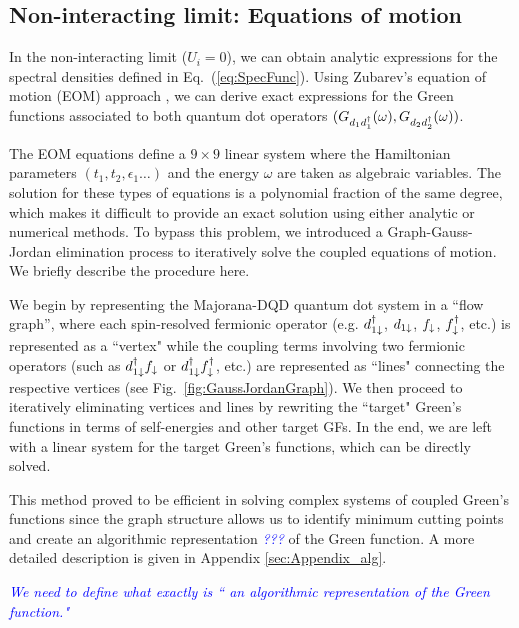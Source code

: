 \documentclass[showpacs,aps,prb,reprint,superscriptaddress]{revtex4-1}
\newcommand{\LUIS}[1]{\textcolor{blue}{\fbox{Luis} {\sl#1}}}
\begin{document}
\subsection{Non-interacting limit: Equations of motion }
\label{sec:non-interactingMethods}

In the non-interacting limit ($U_i\!=\!0$), we can obtain analytic expressions for the spectral densities defined in Eq.\ (\ref{eq:SpecFunc}). Using Zubarev's equation of motion (EOM) approach \cite{zubarev_double-time_1960}, we can derive  exact expressions for the Green functions associated to both quantum dot operators $(G_{d_1d^\dagger_1}(\omega),G_{d_2d^\dagger_2}(\omega))$. 

 The EOM  equations define a $9 \times 9$ linear system where the Hamiltonian parameters $(t_1,t_2,\epsilon_1 \ldots)$ and the energy $\omega$ are taken as algebraic variables. The solution for these types of equations is a polynomial fraction of the same degree, which makes it difficult to provide an exact solution using either analytic or numerical methods. To bypass this problem, we introduced a Graph-Gauss-Jordan elimination process \cite{spielman_algorithms_2010} to iteratively solve the coupled equations of motion. We briefly describe the procedure here. 

We begin by representing the Majorana-DQD quantum dot system in a ``flow graph'', where each spin-resolved fermionic operator (e.g. $d^{\dagger}_{1 \downarrow}$, $d_{1 \downarrow}$, $f_{\downarrow}$, $f^{\dagger}_{\downarrow}$, etc.) is represented as a ``vertex" while the coupling terms involving two fermionic operators  (such as $d^{\dagger}_{1 \downarrow} f_{\downarrow}$ or $d^{\dagger}_{1 \downarrow} f^{\dagger}_{\downarrow}$, etc.) are represented as ``lines" connecting the respective vertices (see Fig.\ \ref{fig:GaussJordanGraph}). We then proceed to iteratively eliminating vertices and lines by rewriting the ``target" Green's functions in terms of self-energies and other target GFs. In the end, we are left with a linear system for the target Green's functions, which can be directly solved.  

This method proved to be efficient in solving complex systems of coupled Green's functions since the graph structure allows us to identify minimum cutting points  and create an algorithmic representation \LUIS{???} of the Green function. A more detailed description is given in Appendix \ref{sec:Appendix_alg}.

\LUIS{We need to define what exactly is `` an algorithmic representation of the Green function." }
\end{document}
